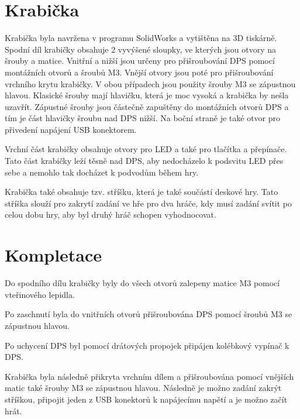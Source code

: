 \chapter{Krabička} %
Krabička byla navržena v programu SolidWorks a vytištěna na 3D tiskárně. Spodní díl krabičky obsahuje 2 vyvýšené sloupky, ve kterých jsou otvory
na šrouby a matice. Vnitřní a nižší jsou určeny pro přišroubování DPS pomocí montážních otvorů a šroubů M3. Vnější otvory jsou poté pro přišroubování 
vrchního krytu krabičky. V obou případech jsou použity šrouby M3 se zápustnou hlavou. Klasické šrouby mají hlavičku, která je moc vysoká a krabička by 
nešla uzavřít. Zápustné šrouby jsou částečně zapuštěny do montážních otvorů DPS a tím je část hlavičky šroubu nad DPS nižší. Na boční straně je také otvor
pro přivedení napájení USB konektorem.

Vrchní část krabičky obsahuje otvory pro LED a také pro tlačítka a přepínače. Tato část krabičky leží těsně nad DPS, aby nedocházelo k podsvitu LED přes
sebe a nemohlo tak docházet k podvodům během hry. 

Krabička také obsahuje tzv. stříšku, která je také součástí deskové hry. Tato stříška slouží pro zakrytí zadání ve hře pro dva hráče, kdy 
musí zadání svítit po celou dobu hry, aby byl druhý hráč schopen vyhodnocovat. 


\chapter{Kompletace} %
Do spodního dílu krabičky byly do všech otvorů zalepeny matice M3 pomocí vteřinového lepidla. 

Po zaschnutí byla do vnitřních otvorů přišroubována DPS pomocí šroubů M3 se zápustnou hlavou. 

Po uchycení DPS byl pomocí drátových propojek připájen kolébkový vypínač k DPS.

Krabička byla následně přikryta vrchním dílem a přišroubována pomocí vnějších matic také šrouby M3 se zápustnou hlavou. Následně je možno zadání zakrýt
stříškou, připojit jeden z USB konektorů k napájecímu napětí a je možno začít hrát.  